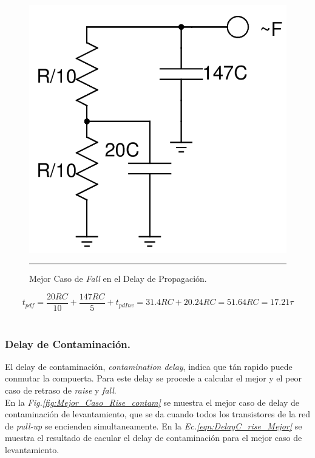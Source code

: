 \documentclass[12pt,a4paper]{article} %
\begin{document}
\begin{figure}[htbp]
  \centering
    \includegraphics[scale=0.25]{./Mejor_caso_Fall_propagacion.png}
    \rule{35em}{0.3pt}
  \caption[C_Carga]{Mejor Caso de \textit{Fall} en el Delay de Propagación.}
  \label{fig:Mejor_caso_Fall_propagacion}
\end{figure}


\begin{equation}\label{eqn:Delay_fall_Mejor}
t_{pdf} = \frac{20RC}{10}+\frac{147RC}{5}+t_{pdInv}=31.4RC+20.24RC=51.64RC=17.21\tau
\end{equation}\\


\subsubsection{Delay de Contaminación.}

El delay de contaminación, \textit{contamination delay}, indica que tán rapido puede conmutar la compuerta. Para este delay se procede a calcular el mejor y el peor caso de retraso de \textit{raise} y \textit{fall}.\\

En la \textit{Fig.\ref{fig:Mejor_Caso_Rise_contam}} se muestra el mejor caso de delay de contaminación de levantamiento, que se da cuando todos los transistores de la red de \textit{pull-up} se encienden simultaneamente. En la \textit{Ec.\ref{eqn:DelayC_rise_Mejor}} se muestra el resultado de cacular el delay de contaminación para el mejor caso de levantamiento.\\
\end{document}
